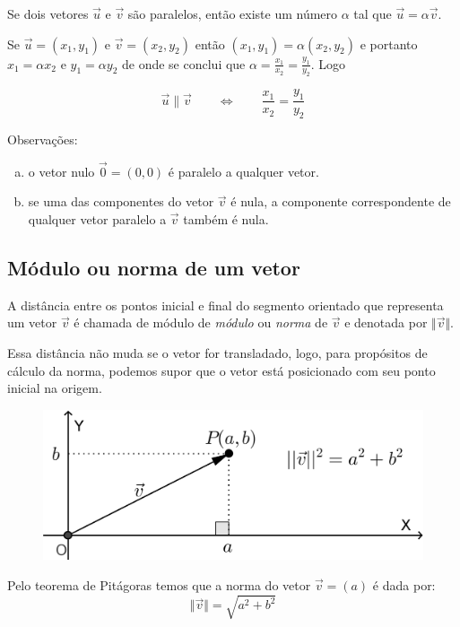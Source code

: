 Se dois vetores $\vec{u}$ e $\vec{v}$ são paralelos, então existe um número $\alpha$ tal que $\vec{u}=\alpha \vec{v}$.

Se $\vec{u}=(x_1, y_1)$ e $\vec{v}=(x_2, y_2)$ então $(x_1, y_1)=\alpha(x_2, y_2)$ e portanto $x_1=\alpha x_2$ e $y_1=\alpha y_2$ de onde se conclui que $\displaystyle \alpha=\frac{x_1}{x_2}=\frac{y_1}{y_2}$. Logo

$$\vec{u} \parallel \vec{v}  \qquad \Longleftrightarrow \qquad \frac{x_1}{x_2}=\frac{y_1}{y_2}$$

Observações:
\begin{enumerate}[a)]
 \item o vetor nulo $\vec{0}=(0, 0)$ é paralelo a qualquer vetor.
 \item se uma das componentes do vetor $\vec{v}$ é nula, a componente correspondente de qualquer vetor paralelo a $\vec{v}$ também é nula.
\end{enumerate}

\subsection{Módulo ou norma de um vetor}

A distância entre os pontos inicial e final do segmento orientado que representa um vetor $\vec{v}$ é chamada de módulo de \textit{módulo} ou \textit{norma} de $\vec{v}$ e denotada por $\Vert\vec{v}\Vert$. 

Essa distância não muda se o vetor for transladado, logo, para propósitos  de  cálculo  da  norma, podemos supor que o vetor está posicionado com seu ponto inicial na origem.

\begin{figure}[H]
\centering
\includegraphics[scale=0.8]{analitica/imagens/norma.png}
\end{figure}

Pelo teorema de Pitágoras temos que a norma do vetor $\vec{v}=(a)$ é dada por: $$\Vert\vec{v}\Vert=\sqrt{a^2+b^2}$$

